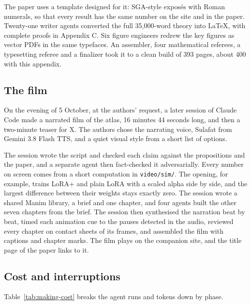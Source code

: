 The paper uses a template designed for it: SGA-style exposés with Roman numerals, so that every result has the same number on the site and in the paper. Twenty-one writer agents converted the full 35,000-word theory into LaTeX, with complete proofs in Appendix C. Six figure engineers redrew the key figures as vector PDFs in the same typefaces. An assembler, four mathematical referees, a typesetting referee and a finalizer took it to a clean build of 393 pages, about 400 with this appendix.

\subsection{The film}

On the evening of 5 October, at the authors' request, a later session of Claude Code made a narrated film of the atlas, 16 minutes 44 seconds long, and then a two-minute teaser for X. The authors chose the narrating voice, Sulafat from Gemini 3.8 Flash TTS, and a quiet visual style from a short list of options.

The session wrote the script and checked each claim against the propositions and the paper, and a separate agent then fact-checked it adversarially. Every number on screen comes from a short computation in \texttt{video/sim/}. The opening, for example, trains LoRA+ and plain LoRA with a scaled alpha side by side, and the largest difference between their weights stays exactly zero. The session wrote a shared Manim library, a brief and one chapter, and four agents built the other seven chapters from the brief. The session then synthesised the narration beat by beat, timed each animation cue to the pauses detected in the audio, reviewed every chapter on contact sheets of its frames, and assembled the film with captions and chapter marks. The film plays on the companion site, and the title page of the paper links to it.

\subsection{Cost and interruptions}

Table~\ref{tab:making-cost} breaks the agent runs and tokens down by phase.

